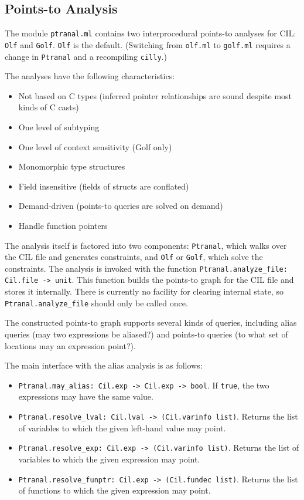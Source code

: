\documentclass[letterpaper]{article}
\def\t#1{{\tt #1}}
\begin{document}
\subsection{Points-to Analysis}

The module \t{ptranal.ml} contains two interprocedural points-to
analyses for CIL: \t{Olf} and \t{Golf}.  \t{Olf} is the default.
(Switching from \t{olf.ml} to \t{golf.ml} requires a change in
\t{Ptranal} and a recompiling \t{cilly}.)

The analyses have the following characteristics:
\begin{itemize}
\item Not based on C types (inferred pointer relationships are sound
  despite most kinds of C casts)
\item One level of subtyping
\item One level of context sensitivity (Golf only)
\item Monomorphic type structures
\item Field insensitive (fields of structs are conflated)
\item Demand-driven (points-to queries are solved on demand)
\item Handle function pointers
\end{itemize}

The analysis itself is factored into two components: \t{Ptranal},
which walks over the CIL file and generates constraints, and \t{Olf}
or \t{Golf}, which solve the constraints.  The analysis is invoked
with the function \t{Ptranal.analyze\_file: Cil.file ->
  unit}.  This function builds the points-to graph for the CIL file
and stores it internally.  There is currently no facility for clearing
internal state, so \t{Ptranal.analyze\_file} should only be called
once.

The constructed points-to graph supports several kinds of queries,
including alias queries (may two expressions be aliased?) and
points-to queries (to what set of locations may an expression point?).

The main interface with the alias analysis is as follows:
\begin{itemize}
\item \t{Ptranal.may\_alias: Cil.exp -> Cil.exp -> bool}. If
  \t{true}, the two expressions may have the same value.
\item \t{Ptranal.resolve\_lval: Cil.lval -> (Cil.varinfo
    list)}.  Returns the list of variables to which the given
  left-hand value may point.
\item \t{Ptranal.resolve\_exp: Cil.exp -> (Cil.varinfo list)}.
  Returns the list of variables to which the given expression may
  point.
\item \t{Ptranal.resolve\_funptr: Cil.exp -> (Cil.fundec
    list)}. Returns the list of functions to which the given
  expression may point.
\end{itemize}
\end{document}
